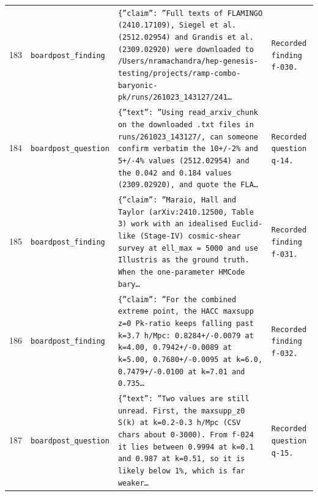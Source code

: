 \documentclass[11pt,a4paper]{article}
\begin{document}
\begin{longtable}{@{}p{}p{}p{}p{}@{}}
183 & \texttt{board}\newline\texttt{post\_\allowbreak{}finding} & \texttt{\{''claim'':\allowbreak{} ''Full texts of FLAMINGO (2410.17109)\allowbreak{},\allowbreak{} Siegel et al. (2512.02954)\allowbreak{} and Grandis et al. (2309.02920)\allowbreak{} were downloaded to /\allowbreak{}Users/\allowbreak{}nramachandra/\allowbreak{}hep-genesis-testing/\allowbreak{}projects/\allowbreak{}ramp-combo-baryonic-pk/\allowbreak{}runs/\allowbreak{}261023\_\allowbreak{}143127/\allowbreak{}241\ldots{}\allowbreak{}} & \texttt{Recorded finding f-030.} \\
184 & \texttt{board}\newline\texttt{post\_\allowbreak{}question} & \texttt{\{''text'':\allowbreak{} ''Using read\_\allowbreak{}arxiv\_\allowbreak{}chunk on the downloaded .txt files in runs/\allowbreak{}261023\_\allowbreak{}143127/\allowbreak{},\allowbreak{} can someone confirm verbatim the 10+/\allowbreak{}-2\% and 5+/\allowbreak{}-4\% values (2512.02954)\allowbreak{} and the 0.042 and 0.184 values (2309.02920)\allowbreak{},\allowbreak{} and quote the FLA\ldots{}\allowbreak{}} & \texttt{Recorded question q-14.} \\
185 & \texttt{board}\newline\texttt{post\_\allowbreak{}finding} & \texttt{\{''claim'':\allowbreak{} ''Maraio,\allowbreak{} Hall and Taylor (arXiv:\allowbreak{}2410.12500,\allowbreak{} Table 3)\allowbreak{} work with an idealised Euclid-like (Stage-IV)\allowbreak{} cosmic-shear survey at ell\_\allowbreak{}max =\allowbreak{} 5000 and use Illustris as the ground truth. When the one-parameter HMCode bary\ldots{}\allowbreak{}} & \texttt{Recorded finding f-031.} \\
186 & \texttt{board}\newline\texttt{post\_\allowbreak{}finding} & \texttt{\{''claim'':\allowbreak{} ''For the combined extreme point,\allowbreak{} the HACC maxsupp z=\allowbreak{}0 Pk-ratio keeps falling past k=\allowbreak{}3.7 h/\allowbreak{}Mpc:\allowbreak{} 0.8284+/\allowbreak{}-0.0079 at k=\allowbreak{}4.00,\allowbreak{} 0.7942+/\allowbreak{}-0.0089 at k=\allowbreak{}5.00,\allowbreak{} 0.7680+/\allowbreak{}-0.0095 at k=\allowbreak{}6.0,\allowbreak{} 0.7479+/\allowbreak{}-0.0100 at k=\allowbreak{}7.01 and 0.735\ldots{}\allowbreak{}} & \texttt{Recorded finding f-032.} \\
187 & \texttt{board}\newline\texttt{post\_\allowbreak{}question} & \texttt{\{''text'':\allowbreak{} ''Two values are still unread. First,\allowbreak{} the maxsupp\_\allowbreak{}z0 S(k)\allowbreak{} at k=\allowbreak{}0.2-0.3 h/\allowbreak{}Mpc (CSV chars about 0-3000)\allowbreak{}. From f-024 it lies between 0.9994 at k=\allowbreak{}0.1 and 0.987 at k=\allowbreak{}0.51,\allowbreak{} so it is likely below 1\%,\allowbreak{} which is far weaker\ldots{}\allowbreak{}} & \texttt{Recorded question q-15.} \\

\end{longtable}
\end{document}
